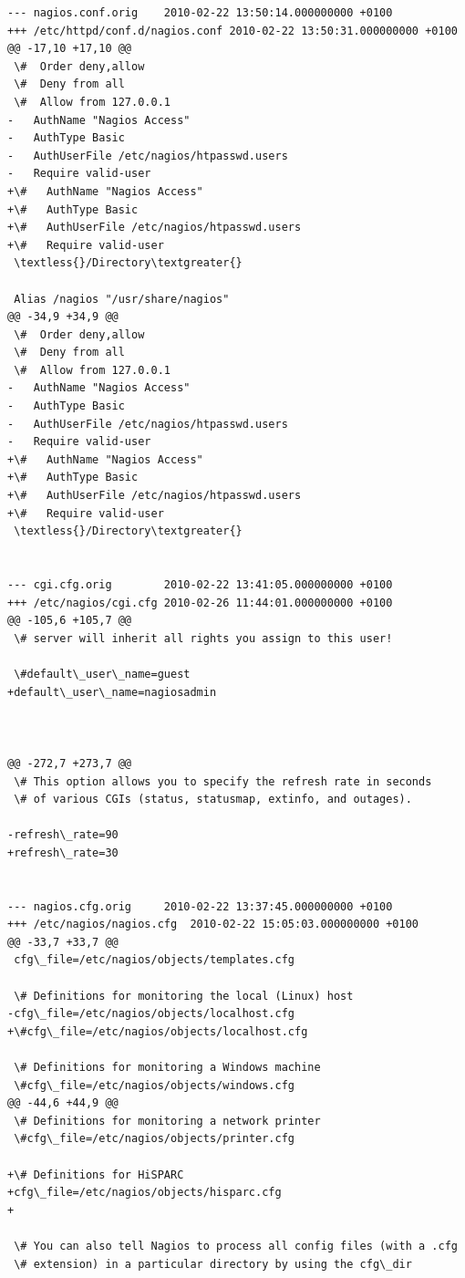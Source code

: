 \documentclass[a4paper,11pt,english]{sphinxmanual}
\begin{document}
\begin{Verbatim}[commandchars=\\\{\}]
--- nagios.conf.orig    2010-02-22 13:50:14.000000000 +0100
+++ /etc/httpd/conf.d/nagios.conf 2010-02-22 13:50:31.000000000 +0100
@@ -17,10 +17,10 @@
 \#  Order deny,allow
 \#  Deny from all
 \#  Allow from 127.0.0.1
-   AuthName "Nagios Access"
-   AuthType Basic
-   AuthUserFile /etc/nagios/htpasswd.users
-   Require valid-user
+\#   AuthName "Nagios Access"
+\#   AuthType Basic
+\#   AuthUserFile /etc/nagios/htpasswd.users
+\#   Require valid-user
 \textless{}/Directory\textgreater{}

 Alias /nagios "/usr/share/nagios"
@@ -34,9 +34,9 @@
 \#  Order deny,allow
 \#  Deny from all
 \#  Allow from 127.0.0.1
-   AuthName "Nagios Access"
-   AuthType Basic
-   AuthUserFile /etc/nagios/htpasswd.users
-   Require valid-user
+\#   AuthName "Nagios Access"
+\#   AuthType Basic
+\#   AuthUserFile /etc/nagios/htpasswd.users
+\#   Require valid-user
 \textless{}/Directory\textgreater{}


--- cgi.cfg.orig        2010-02-22 13:41:05.000000000 +0100
+++ /etc/nagios/cgi.cfg 2010-02-26 11:44:01.000000000 +0100
@@ -105,6 +105,7 @@
 \# server will inherit all rights you assign to this user!

 \#default\_user\_name=guest
+default\_user\_name=nagiosadmin



@@ -272,7 +273,7 @@
 \# This option allows you to specify the refresh rate in seconds
 \# of various CGIs (status, statusmap, extinfo, and outages).

-refresh\_rate=90
+refresh\_rate=30


--- nagios.cfg.orig     2010-02-22 13:37:45.000000000 +0100
+++ /etc/nagios/nagios.cfg  2010-02-22 15:05:03.000000000 +0100
@@ -33,7 +33,7 @@
 cfg\_file=/etc/nagios/objects/templates.cfg

 \# Definitions for monitoring the local (Linux) host
-cfg\_file=/etc/nagios/objects/localhost.cfg
+\#cfg\_file=/etc/nagios/objects/localhost.cfg

 \# Definitions for monitoring a Windows machine
 \#cfg\_file=/etc/nagios/objects/windows.cfg
@@ -44,6 +44,9 @@
 \# Definitions for monitoring a network printer
 \#cfg\_file=/etc/nagios/objects/printer.cfg

+\# Definitions for HiSPARC
+cfg\_file=/etc/nagios/objects/hisparc.cfg
+

 \# You can also tell Nagios to process all config files (with a .cfg
 \# extension) in a particular directory by using the cfg\_dir



\end{Verbatim}
\end{document}
